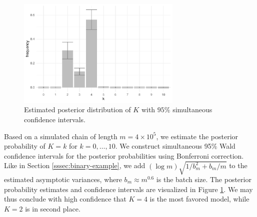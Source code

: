 \documentclass[12pt]{article}
\begin{document}
\begin{figure}
	\centering
	\includegraphics[width=0.7\textwidth]{robustmcmc-bonf}
	\caption{Estimated posterior distribution of $K$ with $95\%$ simultaneous confidence intervals.} \label{fig:varmcmc-2}
\end{figure}





Based on a simulated chain of length $m = 4 \times 10^5$, we estimate the posterior probability of $K = k$ for $k = 0,\dots,10$.
We construct simultaneous 95\% Wald confidence intervals for the posterior probabilities using Bonferroni correction.
Like in Section \ref{sssec:binary-example}, we add $(\log m) \sqrt{1/b_m^2+b_m/m}$ to the estimated asymptotic variances, where $b_m \approx m^{0.6}$ is the batch size.
The posterior probability estimates and confidence intervals are visualized in Figure \ref{fig:varmcmc-2}.
We may thus conclude with high confidence that $K=4$ is the most favored model, while $K=2$ is in second place.
\end{document}
